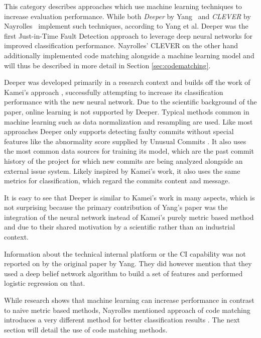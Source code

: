 This category describes approaches which use machine learning techniques to increase evaluation performance.
While both \textit{Deeper} by Yang~\cite{Yang2015} and \textit{CLEVER} by Nayrolles~\cite{Nayrolles2018} implement such techniques, according to Yang et al. Deeper was the first Just-in-Time Fault Detection approach to leverage deep neural networks for improved classification performance. Nayrolles' CLEVER on the other hand additionally implemented code matching alongside a machine learning model and will thus be described in more detail in Section \ref{sec:codematching}.

Deeper was developed primarily in a research context and builds off the work of Kamei's approach \cite{Kamei2013}, successfully attempting to increase its classification performance with the new neural network. Due to the scientific background of the paper, online learning is not supported by Deeper. Typical methods common in machine learning such as data normalization and resampling are used. Like most approaches Deeper only supports detecting faulty commits without special features like the abnormality score supplied by Unusual Commits \cite{Goyal2017}. It also uses the most common data sources for training its model, which are the past commit history of the project for which new commits are being analyzed alongside an external issue system. Likely inspired by Kamei's work, it also uses the same metrics for classification, which regard the commits content and message. 

It is easy to see that Deeper is similar to Kamei's work in many aspects, which is not surprising because the primary contribution of Yang's paper was the integration of the neural network instead of Kamei's purely metric based method and 
due to their shared motivation by a scientific rather than an industrial context.

Information about the technical internal platform or the CI capability was not reported on by the original paper by Yang. They did however mention that they used a deep belief network algorithm to build a set of features and performed logistic regression on that.

While research shows that machine learning can increase performance in contrast to naive metric based methods, Nayrolles mentioned approach of code matching introduces a very different method for better classification results \cite{Nayrolles2018}. The next section will detail the use of code matching methods.

